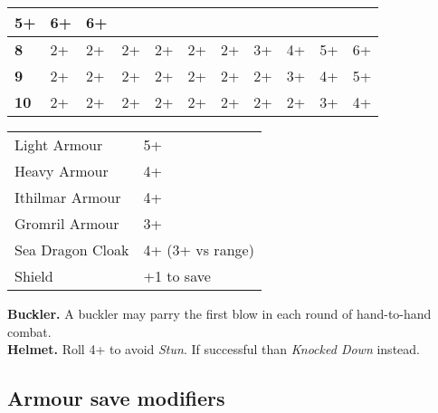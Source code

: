 \begin{nscenter}
{\begin{tabular}{|l|llllllllll|}
\multicolumn{1}{l|}{5+} &
\multicolumn{1}{l|}{6+} &
6+ \\ \hline
\textbf{8} &
\multicolumn{1}{l|}{2+} &
\multicolumn{1}{l|}{2+} &
\multicolumn{1}{l|}{2+} &
\multicolumn{1}{l|}{2+} &
\multicolumn{1}{l|}{2+} &
\multicolumn{1}{l|}{2+} &
\multicolumn{1}{l|}{3+} &
\multicolumn{1}{l|}{4+} &
\multicolumn{1}{l|}{5+} &
6+ \\ \hline
\textbf{9} &
\multicolumn{1}{l|}{2+} &
\multicolumn{1}{l|}{2+} &
\multicolumn{1}{l|}{2+} &
\multicolumn{1}{l|}{2+} &
\multicolumn{1}{l|}{2+} &
\multicolumn{1}{l|}{2+} &
\multicolumn{1}{l|}{2+} &
\multicolumn{1}{l|}{3+} &
\multicolumn{1}{l|}{4+} &
5+ \\ \hline
\textbf{10} &
\multicolumn{1}{l|}{2+} &
\multicolumn{1}{l|}{2+} &
\multicolumn{1}{l|}{2+} &
\multicolumn{1}{l|}{2+} &
\multicolumn{1}{l|}{2+} &
\multicolumn{1}{l|}{2+} &
\multicolumn{1}{l|}{2+} &
\multicolumn{1}{l|}{2+} &
\multicolumn{1}{l|}{3+} &
4+ \\ \hline
\end{tabular}
}
\end{nscenter}

\begin{nscenter}
\begin{tabular}{ll}
Light Armour     & 5+         \\
Heavy Armour     & 4+         \\
Ithilmar Armour  & 4+         \\
Gromril Armour   & 3+         \\
Sea Dragon Cloak & 4+ (3+ vs range)    \\
Shield           & +1 to save
\end{tabular}
\end{nscenter}
\textbf{Buckler.} A buckler may parry the first blow in each
round of hand-to-hand combat.\\
\textbf{Helmet.} Roll 4+ to avoid \textit{Stun}. If successful than
\textit{Knocked Down} instead.

\subsection*{Armour save modifiers}
\begin{nscenter}
\end{nscenter}


